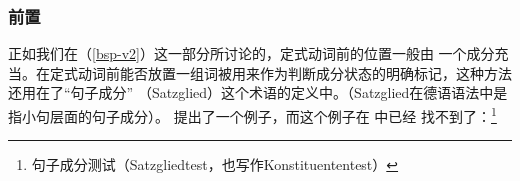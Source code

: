 \subsubsection{前置}
\label{sec-konst-test-probleme-voranstellung} 
正如我们在（\ref{bsp-v2}）这一部分所讨论的，定式动词前的位置一般由
一个成分充当。在定式动词前能否放置一组词被用来作为判断成分状态的明确标记，这种方法还用在了“句子成分”
（Satzglied）这个术语的定义中。（Satzglied在德语语法中是指小句层面的句子成分）\citep[]{Duden2005-Authors}。 提出了一个例子，而这个例子在 中已经
找不到了：\footnote{%
句子成分测试（Satzgliedtest，也写作Konstituententest）}
